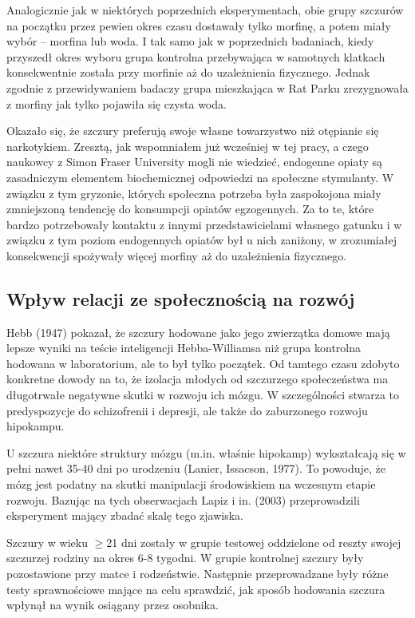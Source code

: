 \documentclass{psychol}
\begin{document}
Analogicznie jak w niektórych poprzednich eksperymentach, obie grupy szczurów na początku przez pewien okres czasu dostawały tylko morfinę, a potem miały wybór -- morfina lub woda. I tak samo jak w poprzednich badaniach, kiedy przyszedł okres wyboru grupa kontrolna przebywająca w samotnych klatkach konsekwentnie została przy morfinie aż do uzależnienia fizycznego. Jednak zgodnie z przewidywaniem badaczy grupa mieszkająca w Rat Parku zrezygnowała z morfiny jak tylko pojawiła się czysta woda.

Okazało się, że szczury preferują swoje własne towarzystwo niż otępianie się narkotykiem. Zresztą, jak wspomniałem już wcześniej w tej pracy, a czego naukowcy z Simon Fraser University mogli nie wiedzieć, endogenne opiaty są zasadniczym elementem biochemicznej odpowiedzi na społeczne stymulanty. W związku z tym gryzonie, których społeczna potrzeba była zaspokojona miały zmniejszoną tendencję do konsumpcji opiatów egzogennych. Za to te, które bardzo potrzebowały kontaktu z innymi przedstawicielami własnego gatunku i w związku z tym poziom endogennych opiatów był u nich zaniżony, w zrozumiałej konsekwencji spożywały więcej morfiny aż do uzależnienia fizycznego.

\subsection{Wpływ relacji ze społecznością na rozwój}

Hebb (1947) pokazał, że szczury hodowane jako jego zwierzątka domowe mają lepsze wyniki na teście inteligencji Hebba-Williamsa niż grupa kontrolna hodowana w laboratorium, ale to był tylko początek. Od tamtego czasu zdobyto konkretne dowody na to, że izolacja młodych od szczurzego społeczeństwa ma długotrwałe negatywne skutki w rozwoju ich mózgu. W szczególności stwarza to predyspozycje do schizofrenii i depresji, ale także do zaburzonego rozwoju hipokampu.

U szczura niektóre struktury mózgu (m.in. właśnie hipokamp) wykształcają się w pełni nawet 35-40 dni po urodzeniu (Lanier, Issacson, 1977). To powoduje, że mózg jest podatny na skutki manipulacji środowiskiem na wczesnym etapie rozwoju. Bazując na tych obserwacjach Lapiz i in. (2003) przeprowadzili eksperyment mający zbadać skalę tego zjawiska.

Szczury w wieku $\geq$21 dni zostały w grupie testowej oddzielone od reszty swojej szczurzej rodziny na okres 6-8 tygodni. W grupie kontrolnej szczury były pozostawione przy matce i rodzeństwie. Następnie przeprowadzane były różne testy sprawnościowe mające na celu sprawdzić, jak sposób hodowania szczura wpłynął na wynik osiągany przez osobnika.
\end{document}
